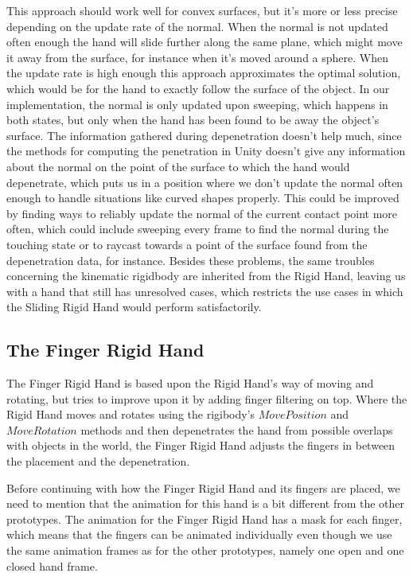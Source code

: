 This approach should work well for convex surfaces, but it's more or less precise depending on the update rate of the normal. When the normal is not updated often enough the hand will slide further along the same plane, which might move it away from the surface, for instance when it's moved around a sphere. When the update rate is high enough this approach approximates the optimal solution, which would be for the hand to exactly follow the surface of the object. In our implementation, the normal is only updated upon sweeping, which happens in both states, but only when the hand has been found to be away the object's surface. The information gathered during depenetration doesn't help much, since the methods for computing the penetration in Unity doesn't give any information about the normal on the point of the surface to which the hand would depenetrate, which puts us in a position where we don't update the normal often enough to handle situations like curved shapes properly. This could be improved by finding ways to reliably update the normal of the current contact point more often, which could include sweeping every frame to find the normal during the touching state or to raycast towards a point of the surface found from the depenetration data, for instance. Besides these problems, the same troubles concerning the kinematic rigidbody are inherited from the Rigid Hand, leaving us with a hand that still has unresolved cases, which restricts the use cases in which the Sliding Rigid Hand would perform satisfactorily.

\subsection{The Finger Rigid Hand}
\label{subsec:fingerRigidHand}
The Finger Rigid Hand is based upon the Rigid Hand's way of moving and rotating, but tries to improve upon it by adding finger filtering on top. Where the Rigid Hand moves and rotates using the rigibody's $MovePosition$ and $MoveRotation$ methods and then depenetrates the hand from possible overlaps with objects in the world, the Finger Rigid Hand adjusts the fingers in between the placement and the depenetration.

Before continuing with how the Finger Rigid Hand and its fingers are placed, we need to mention that the animation for this hand is a bit different from the other prototypes. The animation for the Finger Rigid Hand has a mask for each finger, which means that the fingers can be animated individually even though we use the same animation frames as for the other prototypes, namely one open and one closed hand frame.

